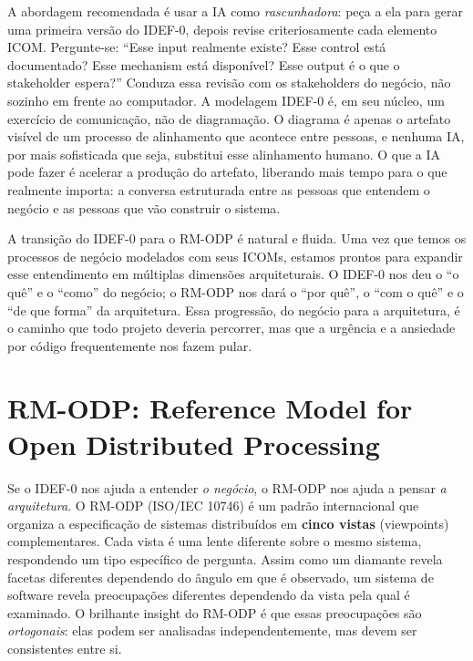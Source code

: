A abordagem recomendada é usar a IA como \emph{rascunhadora}: peça a ela para
gerar uma primeira versão do IDEF-0, depois revise criteriosamente cada elemento
ICOM. Pergunte-se: ``Esse input realmente existe? Esse control está documentado?
Esse mechanism está disponível? Esse output é o que o stakeholder espera?'' Conduza
essa revisão com os stakeholders do negócio, não sozinho em frente ao computador.
A modelagem IDEF-0 é, em seu núcleo, um exercício de comunicação, não de
diagramação. O diagrama é apenas o artefato visível de um processo de alinhamento
que acontece entre pessoas, e nenhuma IA, por mais sofisticada que seja,
substitui esse alinhamento humano. O que a IA pode fazer é acelerar a produção do
artefato, liberando mais tempo para o que realmente importa: a conversa
estruturada entre as pessoas que entendem o negócio e as pessoas que vão
construir o sistema.

A transição do IDEF-0 para o RM-ODP é natural e fluida. Uma vez que temos os
processos de negócio modelados com seus ICOMs, estamos prontos para expandir esse
entendimento em múltiplas dimensões arquiteturais. O IDEF-0 nos deu o ``o quê'' e
o ``como'' do negócio; o RM-ODP nos dará o ``por quê'', o ``com o quê'' e o ``de
que forma'' da arquitetura. Essa progressão, do negócio para a arquitetura, é
o caminho que todo projeto deveria percorrer, mas que a urgência e a ansiedade por
código frequentemente nos fazem pular.


\section{RM-ODP: Reference Model for Open Distributed Processing}

Se o IDEF-0 nos ajuda a entender \emph{o negócio}, o RM-ODP nos ajuda a pensar
\emph{a arquitetura}. O RM-ODP (ISO/IEC 10746) é um padrão internacional que
organiza a especificação de sistemas distribuídos em \textbf{cinco vistas}
(viewpoints) complementares. Cada vista é uma lente diferente sobre o mesmo
sistema, respondendo um tipo específico de pergunta. Assim como um diamante revela
facetas diferentes dependendo do ângulo em que é observado, um sistema de software
revela preocupações diferentes dependendo da vista pela qual é examinado. O
brilhante insight do RM-ODP é que essas preocupações são \emph{ortogonais}: elas
podem ser analisadas independentemente, mas devem ser consistentes entre si.


